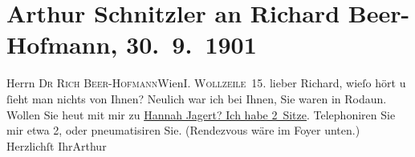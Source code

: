 

         
         \renewcommand{\erwaehntePersonen}{Personen: Richard Beer-Hofmann}
         \renewcommand{\erwaehnteOrte}{Orte: I., Innere Stadt, Rodaun, Wien, Wollzeile}
         \renewcommand{\erwaehnteWerke}{Werke: Hanna Jagert. Komödie}
               \section[Arthur Schnitzler an Richard Beer-Hofmann, 30. 9. 1901]{ Arthur Schnitzler an Richard Beer-Hofmann, 30. 9. 1901}\nopagebreak{}\rehead{ }\begin{ledgroupsized}[t]{13cm}\normalsize\beginnumbering \toendnotes[C]{\smallbreak\pagebreak[2]} 
\pstart{}{\pb}Herrn \textsc{Dr Rich
                     Beer-Hofmann}\pend{}\pstart{}Wien\pend{}\pstart{}\textsc{I. Wollzeile 15}.\pend{}{\bigskip}\pstart
           \noindent{}{\pb}lieber Richard, wieſo hört u ſieht man nichts von Ihnen? Neulich war
               ich bei Ihnen, Sie waren in Rodaun. Wollen Sie
               heut mit mir zu \uline{Hannah Jagert? Ich habe 2 Sitze}.
               Telephoniren Sie mir etwa 2, oder pneumatisiren Sie. \introOben{}(Rendezvous wäre im Foyer unten.)\introOben{}\pend
           \pstart Herzlichſt Ihr\spacefill\mbox{Arthur}\pend{}
         
         \endnumbering{}\end{ledgroupsized}  \newcommand{\dateiname}{L01176}\newcommand{\titel}{Arthur Schnitzler an Richard Beer-Hofmann, 30. 9. 1901}\newcommand{\editorInnen}{Martin Anton Müller und Gerd-Hermann Susen}
      
